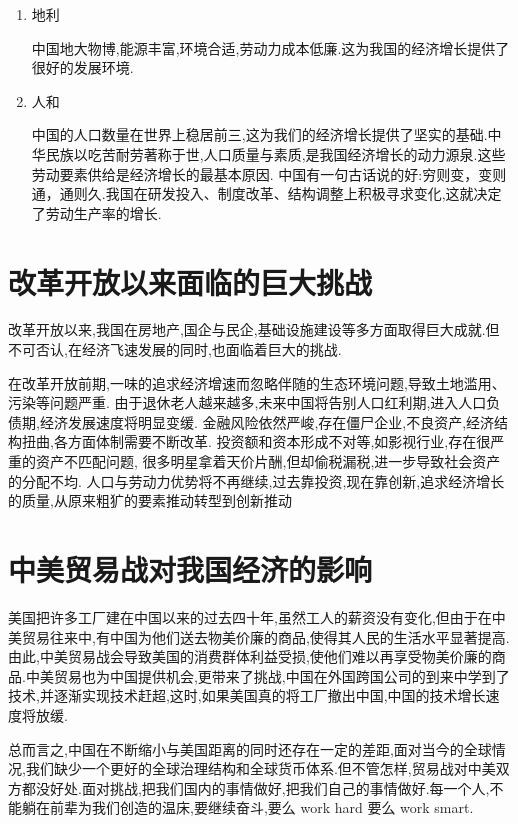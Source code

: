 \documentclass[UTF8]{ctexart} %
\begin{document}
{{\begin{enumerate}
\item 地利

中国地大物博,能源丰富,环境合适,劳动力成本低廉.这为我国的经济增长提供了很好的发展环境.

\item 人和

中国的人口数量在世界上稳居前三,这为我们的经济增长提供了坚实的基础.中华民族以吃苦耐劳著称于世,人口质量与素质,是我国经济增长的动力源泉.这些劳动要素供给是经济增长的最基本原因.
中国有一句古话说的好:穷则变，变则通，通则久.我国在研发投入、制度改革、结构调整上积极寻求变化,这就决定了劳动生产率的增长.
\end  {enumerate}

\section{改革开放以来面临的巨大挑战}

改革开放以来,我国在房地产,国企与民企,基础设施建设等多方面取得巨大成就.但不可否认,在经济飞速发展的同时,也面临着巨大的挑战.

在改革开放前期,一味的追求经济增速而忽略伴随的生态环境问题,导致土地滥用、污染等问题严重.
由于退休老人越来越多,未来中国将告别人口红利期,进入人口负债期,经济发展速度将明显变缓.
金融风险依然严峻,存在僵尸企业,不良资产,经济结构扭曲,各方面体制需要不断改革.
投资额和资本形成不对等,如影视行业,存在很严重的资产不匹配问题,
很多明星拿着天价片酬,但却偷税漏税,进一步导致社会资产的分配不均.
人口与劳动力优势将不再继续,过去靠投资,现在靠创新,追求经济增长的质量,从原来粗犷的要素推动转型到创新推动
	
\section{中美贸易战对我国经济的影响}

美国把许多工厂建在中国以来的过去四十年,虽然工人的薪资没有变化,但由于在中美贸易往来中,有中国为他们送去物美价廉的商品,使得其人民的生活水平显著提高.由此,中美贸易战会导致美国的消费群体利益受损,使他们难以再享受物美价廉的商品.中美贸易也为中国提供机会,更带来了挑战,中国在外国跨国公司的到来中学到了技术,并逐渐实现技术赶超,这时,如果美国真的将工厂撤出中国,中国的技术增长速度将放缓.

总而言之,中国在不断缩小与美国距离的同时还存在一定的差距,面对当今的全球情况,我们缺少一个更好的全球治理结构和全球货币体系.但不管怎样,贸易战对中美双方都没好处.面对挑战,把我们国内的事情做好,把我们自己的事情做好.每一个人,不能躺在前辈为我们创造的温床,要继续奋斗,要么 work hard 要么 work smart.

}}
\end{document}
